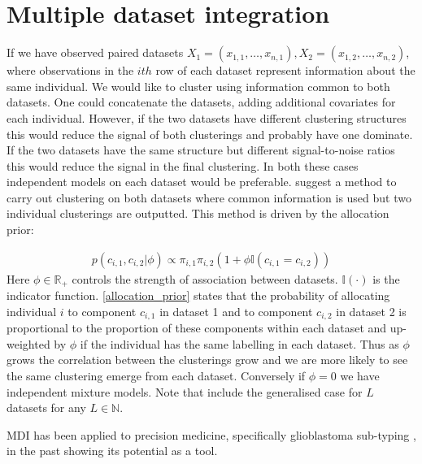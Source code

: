 \documentclass[11pt]{article} %
\begin{document}
\section{Multiple dataset integration}
If we have observed paired datasets $X_1 = (x_{1,1},\ldots,x_{n,1}), X_2 = (x_{1,2},\ldots,x_{n,2})$, where observations in the $ith$ row of each dataset represent information about the same individual. We would like to cluster using information common to both datasets. One could concatenate the datasets, adding additional covariates for each individual. However, if the two datasets have different clustering structures this would reduce the signal of both clusterings and probably have one dominate. If the two datasets have the same structure but different signal-to-noise ratios this would reduce the signal in the final clustering. In both these cases independent models on each dataset would be preferable. \citet{kirkBayesianCorrelatedClustering2012} suggest a method to carry out clustering on both datasets where common information is used but two individual clusterings are outputted. This method is driven by the allocation prior:

\begin{align} \label{allocation_prior}
p(c_{i,1}, c_{i,2} | \phi ) \propto \pi_{i,1} \pi_{i,2} (1 + \phi \mathbb{I}(c_{i,1} = c_{i,2}))
\end{align}
Here $\phi \in \mathbb{R}_+$ controls the strength of association between datasets. $\mathbb{I}(\cdot)$ is the indicator function. \eqref{allocation_prior} states that the probability of allocating individual $i$ to component $c_{i,1}$ in dataset 1 and to component $c_{i,2}$ in dataset 2 is proportional to the proportion of these components within each dataset and up-weighted by $\phi$ if the individual has the same labelling in each dataset. Thus as $\phi$ grows the correlation between the clusterings grow and we are more likely to see the same clustering emerge from each dataset. Conversely if $\phi = 0$ we have independent mixture models. Note that \citet{kirkBayesianCorrelatedClustering2012} include the generalised case for $L$ datasets for any $L \in \mathbb{N}$.

MDI has been applied to precision medicine, specifically glioblastoma sub-typing \cite{SavageIdentifyingcancersubtypes2013a}, in the past showing its potential as a tool.
\end{document}
